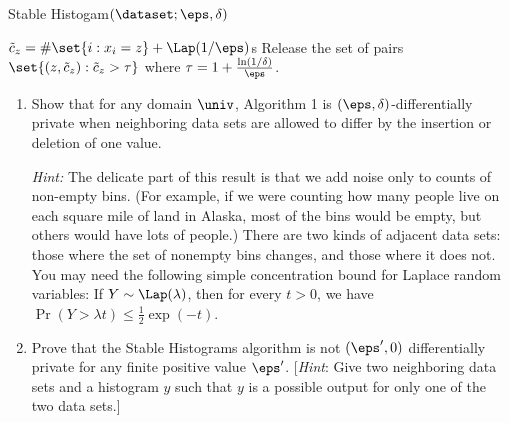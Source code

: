 \documentclass[11pt]{article}
\begin{document}
\begin{enumerate}[leftmargin=\parindent, itemsep=3ex]
  \begin{algorithm}[H]
  	\DontPrintSemicolon
    \caption{Stable Histogam$(\dataset; \eps,\delta)$}
    {
      $\tilde c_z = \#\set{i: x_i =z} + \Lap(1/\eps)$s
    }
    Release the set of pairs $\set{(z, \tilde c_z) : \tilde c_z >
      \tau}$ where $\tau = 1+ \frac{\ln(1/\delta)}{\eps}$. 
  \end{algorithm}

  \begin{enumerate}
  \item Show that for any domain $\univ$, Algorithm 1 is
    $(\eps,\delta)$-differentially private when neighboring data sets
    are allowed to differ by the insertion or deletion of one value.

  
    \emph{Hint:} The delicate part of this result is that we add noise
    only to counts of non-empty bins. (For example, if we were
    counting how many people live on each square mile of land in
    Alaska, most of the bins would be empty, but others would have
    lots of people.) There are two kinds of adjacent data sets: those
    where the set of nonempty bins changes, and those where it does
    not.  You may need the following simple concentration bound for
    Laplace random variables: If $Y\sim\Lap(\lambda)$, then for every
    $t>0$, we have $\Pr( Y >\lambda t ) \leq \frac 1 2 \exp(-t)$.
  

    \item Prove that the Stable Histograms
    algorithm is not $(\eps',0)$ differentially private for any finite
    positive value $\eps'$. [\emph{Hint}: Give two neighboring data sets and
    a histogram $y$ such that $y$ is  a possible output for only one of
    the two data sets.]
  \end{enumerate}

\end{enumerate}
\end{document}
